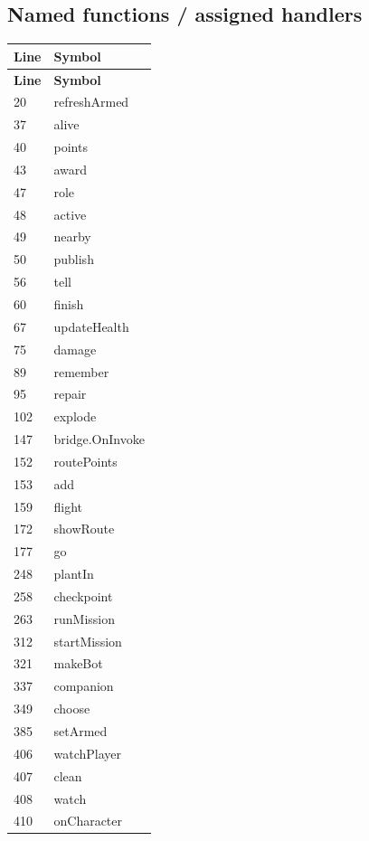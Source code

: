 \subsection{Named functions /\allowbreak{} assigned handlers}
\begin{longtable}{p{}p{}}
\toprule
\textbf{Line} & \textbf{Symbol} \\ \midrule
\endfirsthead
\textbf{Line} & \textbf{Symbol} \\ \midrule
\endhead
20 & refreshArmed \\
37 & alive \\
40 & points \\
43 & award \\
47 & role \\
48 & active \\
49 & nearby \\
50 & publish \\
56 & tell \\
60 & finish \\
67 & updateHealth \\
75 & damage \\
89 & remember \\
95 & repair \\
102 & explode \\
147 & bridge.\allowbreak{}OnInvoke \\
152 & routePoints \\
153 & add \\
159 & flight \\
172 & showRoute \\
177 & go \\
248 & plantIn \\
258 & checkpoint \\
263 & runMission \\
312 & startMission \\
321 & makeBot \\
337 & companion \\
349 & choose \\
385 & setArmed \\
406 & watchPlayer \\
407 & clean \\
408 & watch \\
410 & onCharacter \\
\bottomrule
\end{longtable}
